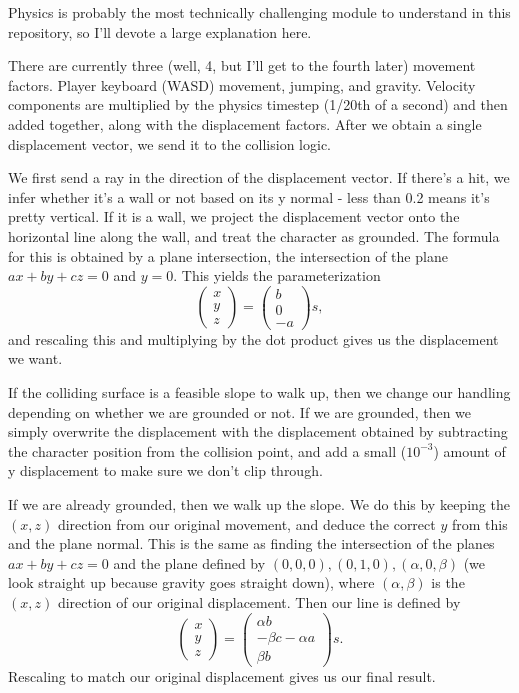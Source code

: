 \documentclass{article}
\begin{document}
Physics is probably the most technically challenging module to understand in this
repository, so I'll devote a large explanation here.

There are currently three (well, 4, but I'll get to the fourth later) movement
factors. Player keyboard (WASD) movement, jumping, and gravity. Velocity
components are multiplied by the physics timestep (1/20th of a second) and then
added together, along with the displacement factors. After we obtain a single
displacement vector, we send it to the collision logic.

We first send a ray in the direction of the displacement vector.
If there's a hit, we infer whether it's a wall or not based on its y normal -
less than 0.2 means it's pretty vertical. If it is a wall, we project the
displacement vector onto the horizontal line along the wall, and treat the character
as grounded.
The formula for this is obtained by a plane intersection, the intersection of the
plane $ax + by + cz = 0$ and $y = 0$. This yields the parameterization
\[
\begin{pmatrix}
    x\\
    y\\
    z 
\end{pmatrix} =
\begin{pmatrix}
    b\\0\\-a
\end{pmatrix}s,\]
and rescaling this and multiplying by the dot product gives us the displacement
we want.

If the colliding surface is a feasible slope to walk up, then we change
our handling depending on whether we are grounded or not. If we are grounded,
then we simply overwrite the displacement with the displacement obtained
by subtracting the character position from the collision point, and
add a small ($10^{-3}$) amount of y displacement to make sure we don't
clip through.

If we are already grounded, then we walk up the slope. We do this by keeping
the $(x, z)$ direction from our original movement, and deduce the correct
$y$ from this and the plane normal. This is the same as finding the
intersection of the planes $ax + by + cz = 0$ and the plane defined by
$(0, 0, 0), (0, 1, 0), (\alpha, 0, \beta)$ (we look straight up because gravity goes
straight down), where $(\alpha, \beta)$ is the $(x, z)$ direction of our
original displacement. Then our line is defined by
\[
\begin{pmatrix}
    x\\y\\z
\end{pmatrix} = 
\begin{pmatrix}
    \alpha b\\-\beta c - \alpha a\\\beta b
\end{pmatrix}s.\]
Rescaling to match our original displacement gives us our final result.
\end{document}
